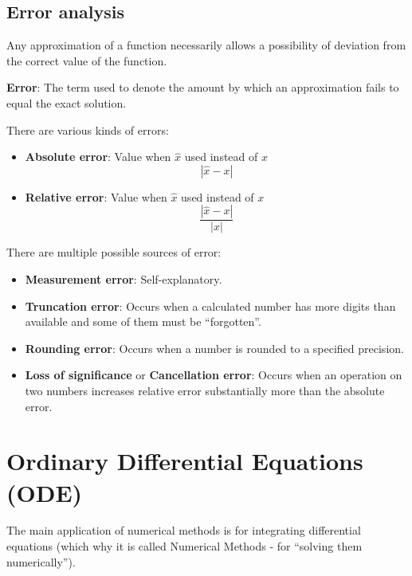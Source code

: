 \documentclass[10pt,a4paper]{article}
\begin{document}
\subsection{Error analysis}

Any approximation of a function necessarily allows a possibility of deviation from the correct value of the function.

\begin{tcolorbox}[breakable,colback=white]
    \textbf{Error}: The term used to denote the amount by which an approximation fails to equal the exact solution.
\end{tcolorbox}

There are various kinds of errors:
\begin{itemize}
    \item \textbf{Absolute error}: Value when $\hat{x}$ used instead of $x$
    $$
        |\hat{x} - x|
    $$
    \item \textbf{Relative error}: Value when $\hat{x}$ used instead of $x$
    $$
        \frac{|\hat{x} - x|}{|x|}
    $$
\end{itemize}

There are multiple possible sources of error:
\begin{itemize}
    \item \textbf{Measurement error}: Self-explanatory.
    \item \textbf{Truncation error}: Occurs when a calculated number has more digits than available and some of them must be “forgotten”.
    \item \textbf{Rounding error}: Occurs when a number is rounded to a specified precision.
    \item \textbf{Loss of significance} or \textbf{Cancellation error}: Occurs when an operation on
    two numbers increases relative error substantially more than the absolute  error.   
\end{itemize}

\pagebreak
\section{Ordinary Differential Equations (ODE)}

The main application of numerical methods is for integrating differential equations (which why it is
called Numerical Methods - for “solving them numerically”).

\end{document}
